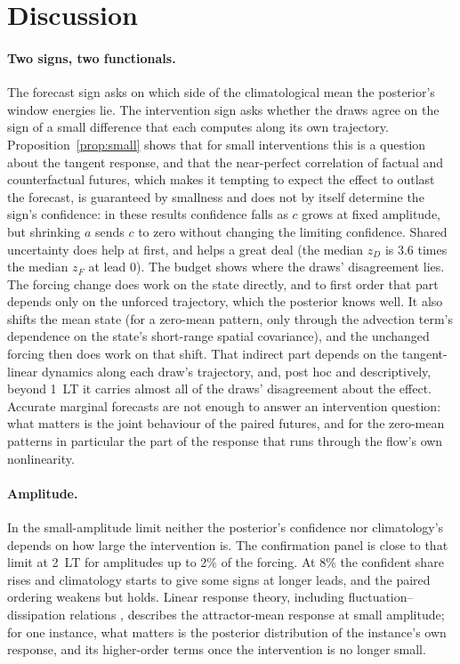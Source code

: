 \documentclass[11pt]{article}
\begin{document}
\section{Discussion}
\label{sec:discussion}

\paragraph{Two signs, two functionals.} The forecast sign asks on which side of the climatological mean the posterior's window energies lie. The intervention sign asks whether the draws agree on the sign of a small difference that each computes along its own trajectory. Proposition~\ref{prop:small} shows that for small interventions this is a question about the tangent response, and that the near-perfect correlation of factual and counterfactual futures, which makes it tempting to expect the effect to outlast the forecast, is guaranteed by smallness and does not by itself determine the sign's confidence: in these results confidence falls as $c$ grows at fixed amplitude, but shrinking $a$ sends $c$ to zero without changing the limiting confidence. Shared uncertainty does help at first, and helps a great deal (the median $z_D$ is 3.6 times the median $z_F$ at lead 0). The budget shows where the draws' disagreement lies. The forcing change does work on the state directly, and to first order that part depends only on the unforced trajectory, which the posterior knows well. It also shifts the mean state (for a zero-mean pattern, only through the advection term's dependence on the state's short-range spatial covariance), and the unchanged forcing then does work on that shift. That indirect part depends on the tangent-linear dynamics along each draw's trajectory, and, post hoc and descriptively, beyond 1~LT it carries almost all of the draws' disagreement about the effect. Accurate marginal forecasts are not enough to answer an intervention question: what matters is the joint behaviour of the paired futures, and for the zero-mean patterns in particular the part of the response that runs through the flow's own nonlinearity.

\paragraph{Amplitude.} In the small-amplitude limit neither the posterior's confidence nor climatology's depends on how large the intervention is. The confirmation panel is close to that limit at 2~LT for amplitudes up to 2\% of the forcing. At 8\% the confident share rises and climatology starts to give some signs at longer leads, and the paired ordering weakens but holds. Linear response theory, including fluctuation--dissipation relations \citep{leith1975climate,majda2010high,marconi2008fluctuation}, describes the attractor-mean response at small amplitude; for one instance, what matters is the posterior distribution of the instance's own response, and its higher-order terms once the intervention is no longer small.
\end{document}
